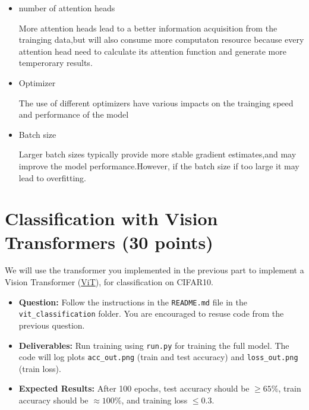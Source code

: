 \documentclass[11pt,addpoints,answers]{exam}
\begin{document}
\begin{questions}
\begin{solution}
\begin{itemize}
    \item{number of attention heads}

    More attention heads lead to a better information acquisition from the trainging data,but will also consume more computaton resource because every attention head need to calculate its attention function and generate more temperorary results.

    \item{Optimizer}

    The use of different optimizers have various impacts on the trainging speed and performance of the model

    \item{Batch size}

    Larger batch sizes typically provide more stable gradient estimates,and may improve the model performance.However, if the batch size if too large it may lead to overfitting.
    
\end{itemize}


\end{solution}


\end{questions}
\clearpage

\section{Classification with Vision Transformers (30 points)}



We will use the transformer you implemented in the previous part to implement a Vision Transformer (\href{https://arxiv.org/abs/2010.11929}{ViT}), for classification on CIFAR10. 

\begin{itemize}
    \item \textbf{Question:} Follow the instructions in the \texttt{README.md} file in the \texttt{vit\_classification} folder. You are encouraged to resuse code from the previous question. 
    \item \textbf{Deliverables:} Run training using \texttt{run.py} for training the full model. The code will log plots \texttt{acc\_out.png} (train and test accuracy) and \texttt{loss\_out.png} (train loss). 
    \item \textbf{Expected Results:} After 100 epochs, test accuracy should be $\geq 65\%$, train accuracy should be $\approx 100\%$, and training loss $\leq 0.3$. 
\end{itemize}
\end{document}
